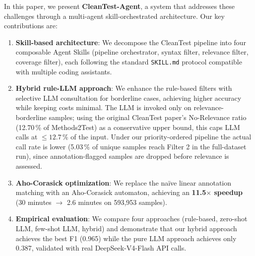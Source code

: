 \documentclass[acmlarge,nonacm,screen]{acmart}
\begin{document}
In this paper, we present \textbf{CleanTest-Agent}, a system that addresses these challenges through a multi-agent skill-orchestrated architecture. Our key contributions are:

\begin{enumerate}
    \item \textbf{Skill-based architecture}: We decompose the CleanTest pipeline into four composable Agent Skills (pipeline orchestrator, syntax filter, relevance filter, coverage filter), each following the standard \texttt{SKILL.md} protocol compatible with multiple coding assistants.

    \item \textbf{Hybrid rule-LLM approach}: We enhance the rule-based filters with selective LLM consultation for borderline cases, achieving higher accuracy while keeping costs minimal. The LLM is invoked only on relevance-borderline samples; using the original CleanTest paper's No-Relevance ratio (12.70\,\% of Methods2Test) as a conservative upper bound, this caps LLM calls at $\leq 12.7\,\%$ of the input. Under our priority-ordered pipeline the actual call rate is lower (5.03\,\% of unique samples reach Filter 2 in the full-dataset run), since annotation-flagged samples are dropped before relevance is assessed.

    \item \textbf{Aho-Corasick optimization}: We replace the na\"ive linear annotation matching with an Aho-Corasick automaton, achieving an \textbf{11.5$\times$ speedup} (30 minutes $\to$ 2.6 minutes on 593,953 samples).

    \item \textbf{Empirical evaluation}: We compare four approaches (rule-based, zero-shot LLM, few-shot LLM, hybrid) and demonstrate that our hybrid approach achieves the best F1 (0.965) while the pure LLM approach achieves only 0.387, validated with real DeepSeek-V4-Flash API calls.
\end{enumerate}
\end{document}
